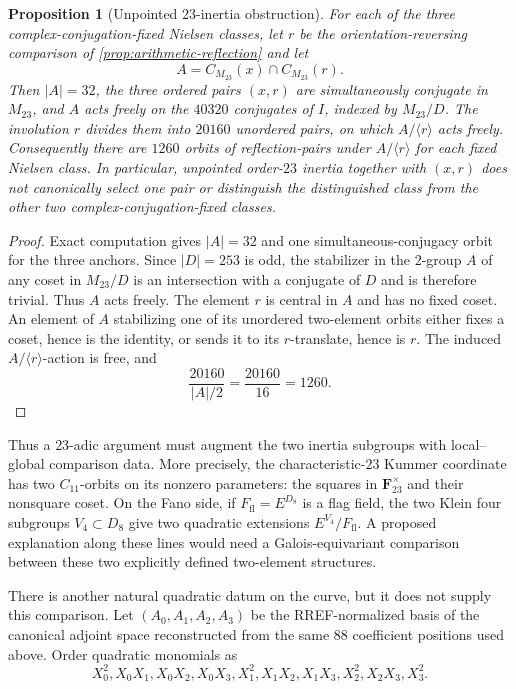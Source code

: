 \documentclass[11pt]{amsart}
\newtheorem{proposition}[proposition]{Proposition}
\theoremstyle{definition}
\theoremstyle{remark}
\newcommand{\FF}{\mathbf F}
\newcommand{\Mtt}{M_{23}}
\begin{document}
\begin{proposition}[Unpointed $23$-inertia obstruction]
\label{prop:gauss-obstruction}
For each of the three complex-conjugation-fixed Nielsen classes, let $r$ be
the orientation-reversing comparison of
\cref{prop:arithmetic-reflection} and let
\[
 A=C_{\Mtt}(x)\cap C_{\Mtt}(r).
\]
Then $|A|=32$, the three ordered pairs $(x,r)$ are simultaneously
conjugate in $\Mtt$, and $A$ acts freely on the $40320$ conjugates of $I$,
indexed by $\Mtt/D$.  The involution $r$ divides them into $20160$ unordered pairs,
on which $A/\langle r\rangle$ acts freely.  Consequently there are $1260$
orbits of reflection-pairs under $A/\langle r\rangle$ for each fixed
Nielsen class.
In particular, unpointed order-$23$ inertia together with $(x,r)$ does not
canonically select one pair or distinguish the distinguished class from the
 other two complex-conjugation-fixed classes.
\end{proposition}

\begin{proof}
Exact computation gives $|A|=32$ and one simultaneous-conjugacy orbit for
the three anchors.  Since $|D|=253$ is odd, the stabilizer in the
$2$-group $A$ of any coset in $\Mtt/D$ is an intersection with a conjugate
of $D$ and is therefore trivial.  Thus $A$ acts freely.  The element $r$
is central in $A$ and has no fixed coset.  An element of $A$ stabilizing
one of its unordered two-element orbits either fixes a coset, hence is the
identity, or sends it to its $r$-translate, hence is $r$.  The induced
$A/\langle r\rangle$-action is free, and
\[
 \frac{20160}{|A|/2}=\frac{20160}{16}=1260.
\]
\end{proof}

Thus a $23$-adic argument must augment the two inertia subgroups with
local--global comparison data.  More precisely, the characteristic-$23$
Kummer coordinate has two $C_{11}$-orbits on its
nonzero parameters: the squares in $\FF_{23}^{\times}$ and their nonsquare
coset.  On the Fano side, if $F_{\mathrm{fl}}=E^{D_8}$ is a flag field,
the two Klein four subgroups $V_4\subset D_8$ give two quadratic extensions
$E^{V_4}/F_{\mathrm{fl}}$.  A proposed explanation along these lines would
need a Galois-equivariant comparison between these two explicitly defined
two-element structures.

\smallskip
There is another natural quadratic datum on the curve, but it does not
supply this comparison.  Let $(A_0,A_1,A_2,A_3)$ be the RREF-normalized
basis of the canonical adjoint space reconstructed from the same $88$
coefficient positions used above.  Order quadratic monomials as
\[
 X_0^2,X_0X_1,X_0X_2,X_0X_3,X_1^2,X_1X_2,X_1X_3,
 X_2^2,X_2X_3,X_3^2.
\]
\end{document}
